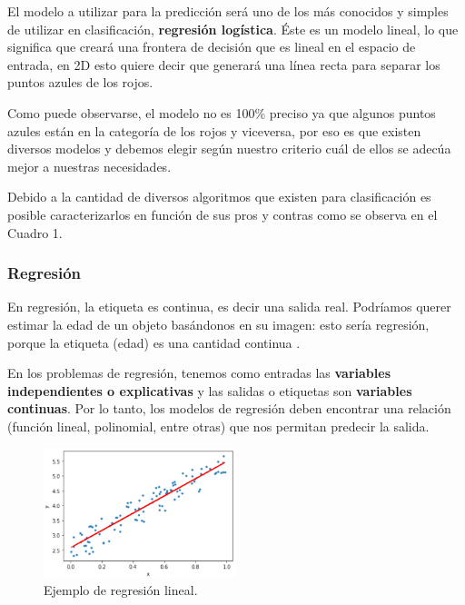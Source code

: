 \documentclass[a4paper,12pt]{article}
\begin{document}
El modelo a utilizar para la predicción será uno de los más conocidos y simples de utilizar en clasificación, \textbf{regresión logística}. Éste es un modelo lineal, lo que significa que creará una frontera de decisión que es lineal en el espacio de entrada, en 2D esto quiere decir que generará una línea recta para separar los puntos azules de los rojos.

Como puede observarse, el modelo no es 100\% preciso ya que algunos puntos azules están en la categoría de los rojos y viceversa, por eso es que existen diversos modelos y debemos elegir según nuestro criterio cuál de ellos se adecúa mejor a nuestras necesidades.

Debido a la cantidad de diversos algoritmos que existen para clasificación es posible caracterizarlos en función de sus pros y contras como se observa en el Cuadro 1.



\subsubsection{Regresión}

En regresión, la etiqueta es continua, es decir una salida real. Podríamos querer estimar la edad de un objeto basándonos en su imagen: esto sería regresión, porque la etiqueta (edad) es una cantidad continua \citep{GitHubpa25:online}.

En los problemas de regresión, tenemos como entradas las \textbf{variables independientes o explicativas} y las salidas o etiquetas son \textbf{variables continuas}. Por lo tanto, los modelos de regresión deben encontrar una relación (función lineal, polinomial, entre otras) que nos permitan predecir la salida.

\begin{figure}[H]
	\begin{center}				
		\includegraphics[width=0.5\textwidth]{tesis_9.png}
		\caption{Ejemplo de regresión lineal.}
		\label{fig:regressionlinear.}
	\end{center}
\end{figure}
\end{document}
